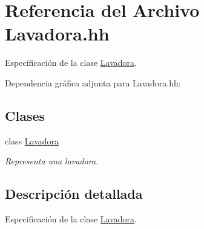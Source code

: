 \hypertarget{_lavadora_8hh}{}\section{Referencia del Archivo Lavadora.\+hh}
\label{_lavadora_8hh}


Especificación de la clase \hyperlink{class_lavadora}{Lavadora}.  


Dependencia gráfica adjunta para Lavadora.\+hh\+:
\subsection*{Clases}
\begin{DoxyCompactItemize}
\item 
class \hyperlink{class_lavadora}{Lavadora}
\begin{DoxyCompactList}\small\item\em Representa una lavadora. \end{DoxyCompactList}\end{DoxyCompactItemize}


\subsection{Descripción detallada}
Especificación de la clase \hyperlink{class_lavadora}{Lavadora}. 


